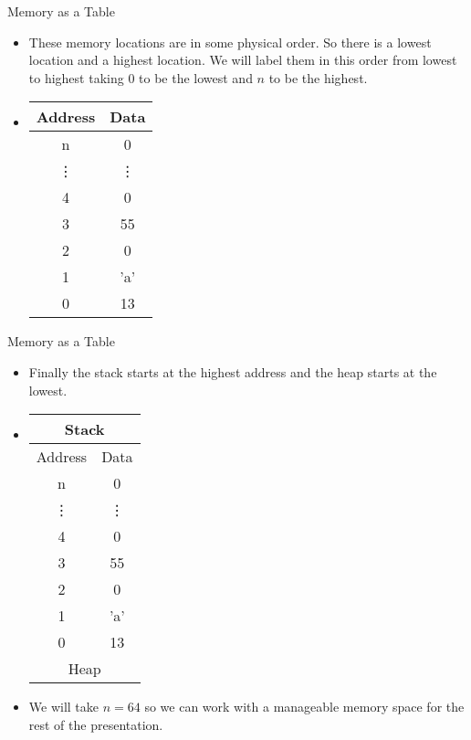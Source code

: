 \documentclass[10pt]{beamer}
\begin{document}
\begin{frame}{Memory as a Table}
\begin{itemize}[<+->]
	\item These memory locations are in some physical order. So there is a lowest location and a highest location. We will label them in this order from lowest to highest taking 0 to be the lowest and $n$ to be the highest.
	\item 
	\begin{tabular}{|c|c|}
		\hline
		Address & Data\\
		\hline
		n &	0\\
		\hline
		\vdots & \vdots \\
		\hline
		4 &	0\\
		\hline
		3 & 55\\
		\hline
		2 & 0\\
		\hline
		1 & 'a'\\
		\hline
		0 & 13\\
		\hline
	\end{tabular}
\end{itemize}
\end{frame}

\begin{frame}{Memory as a Table}
\begin{itemize}[<+->]
	\item Finally the stack starts at the highest address and the heap starts at the lowest.
	\item 
	\begin{tabular}{|c|c|}
		\hline
		\multicolumn{2}{|c|}{Stack}\\
		\hline
		Address & Data\\
		\hline
		n &	0\\
		\hline
		\vdots & \vdots \\
		\hline
		4 &	0\\
		\hline
		3 & 55\\
		\hline
		2 & 0\\
		\hline
		1 & 'a'\\
		\hline
		0 & 13\\
		\hline
		\multicolumn{2}{|c|}{Heap}\\
		\hline
	\end{tabular}
	\item We will take $n=64$ so we can work with a manageable memory space for the rest of the presentation.
\end{itemize}
\end{frame}
\end{document}
